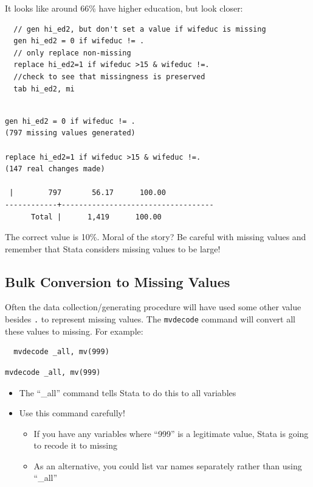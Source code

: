 \documentclass[]{book}
\providecommand{\tightlist}{%
  \setlength{\itemsep}{0pt}\setlength{\parskip}{0pt}}
\begin{document}
It looks like around 66\% have higher education, but look closer:

\begin{verbatim}
  // gen hi_ed2, but don't set a value if wifeduc is missing
  gen hi_ed2 = 0 if wifeduc != . 
  // only replace non-missing
  replace hi_ed2=1 if wifeduc >15 & wifeduc !=. 
  //check to see that missingness is preserved
  tab hi_ed2, mi
\end{verbatim}

\begin{verbatim}

gen hi_ed2 = 0 if wifeduc != . 
(797 missing values generated)

replace hi_ed2=1 if wifeduc >15 & wifeduc !=. 
(147 real changes made)

 |        797       56.17      100.00
------------+-----------------------------------
      Total |      1,419      100.00
\end{verbatim}

The correct value is 10\%. Moral of the story? Be careful with missing values and remember that Stata considers missing values to be large!

\hypertarget{bulk-conversion-to-missing-values}{%
\subsection{Bulk Conversion to Missing Values}\label{bulk-conversion-to-missing-values}}

Often the data collection/generating procedure will have used some other value besides \texttt{.} to represent missing values. The \texttt{mvdecode} command will convert all these values to missing. For example:

\begin{verbatim}
  mvdecode _all, mv(999)
\end{verbatim}

\begin{verbatim}
mvdecode _all, mv(999)
\end{verbatim}

\begin{itemize}
\tightlist
\item
  The ``\_all'' command tells Stata to do this to all variables
\item
  Use this command carefully!

  \begin{itemize}
  \tightlist
  \item
    If you have any variables where ``999'' is a legitimate value, Stata is going to recode it to missing
  \item
    As an alternative, you could list var names separately rather than using ``\_all''
  \end{itemize}
\end{itemize}
\end{document}
